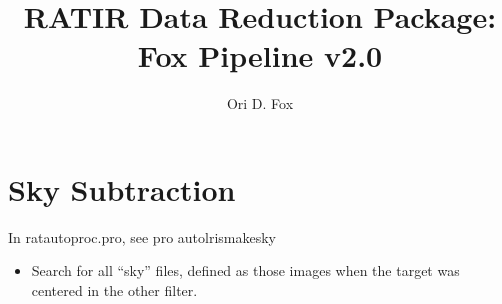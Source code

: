 \documentclass[12pt,preprint]{aastex}
\begin{document}
\title{RATIR Data Reduction Package: Fox Pipeline v2.0}
\author{Ori D. Fox}

\clearpage

\section{Sky Subtraction}
\label{sec:sky}

\noindent In ratautoproc.pro, see pro autolrismakesky

\begin{itemize}
	\item Search for all ``sky'' files, defined as those images when the target was centered in the other filter.
\end{itemize}
\end{document}
